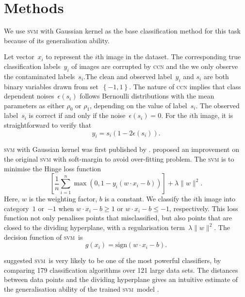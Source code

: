 \documentclass[12pt]{article} %
\newcommand{\svm}{\textsc{svm}}
\begin{document}
\section{Methods}\label{method}
We use \textsc{svm} with Gaussian kernel as the base classification method for this task because of its generalisation ability.

Let vector~$x_i$ to represent the $i$th image in the dataset. The corresponding true classification labels~$y_i$ of images are corrupted by \textsc{ccn} and the we only observe the contaminated labels~$s_i$.The clean and observed label~$y_i$ and $s_i$ are both binary variables drawn from set~$\left\{-1,1\right\}$.  The nature of \textsc{ccn} implies that class dependent noises~$\epsilon(s_i)$ follows Bernoulli distributions with the mean parameters as either $\rho_0$ or $\rho_1$, depending on the value of label~$s_i$. The observed label~$s_i$ is correct if and only if the noise~$\epsilon(s_i)=0$. For the $i$th image, it is straightforward to verify that
\begin{equation} \label{eq:noise}
y_i=s_i(1-2\epsilon(s_i)).
\end{equation}

\textsc{svm} with Gaussian kernel was first published by \citet{Boser:1992:TAO:130385.130401}. 
\citet{Cortes1995} proposed an improvement on the original \textsc{svm} with soft-margin  to  avoid over-fitting problem. The \textsc{svm} is to minimise the Hinge loss function
\begin{equation*}
\left[{\frac {1}{n}}\sum _{i=1}^{n}\max \left(0,1-y_{i}(w\cdot x_{i}-b)\right)\right]+\lambda \lVert w\rVert ^{2}.   
\end{equation*}
Here, $w$ is the weighting factor, $b$ is a constant. We classify the $i$th image into category~$1$ or~$-1$ when $w\cdot x_{i}-b\geq1$ or $w\cdot x_{i}-b\leq-1$, respectively. This loss function not only penalises points that misclassified, but also points that are closed to the dividing hyperplane, with a regularisation term~$\lambda \lVert w\rVert ^{2}$. The decision function of \svm\ is
\begin{equation}\label{eq:decision}
 g(x_{i})=\text{sign}(w\cdot x_{i}-b).
\end{equation}

\citet{Fernandez-Delgado:2014:WNH:2627435.2697065} suggested \svm\ is very likely to be one of the most powerful classifiers, by comparing 179 classification algorithms over 121 large data sets. The distances between data points and the dividing hyperplane gives an intuitive estimate of the generalisation ability of the trained \svm\ model \citep{hastie01statisticallearning}. 
\end{document}
